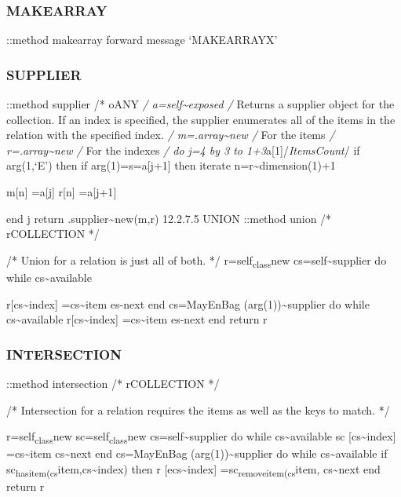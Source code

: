 \hypertarget{makearray-1}{%
\subsubsection{MAKEARRAY}\label{makearray-1}}

::method makearray forward message `MAKEARRAYX'

\hypertarget{supplier-1}{%
\subsubsection{SUPPLIER}\label{supplier-1}}

::method supplier /* oANY \emph{/ a=self\textasciitilde exposed /}
Returns a supplier object for the collection. If an index is specified,
the supplier enumerates all of the items in the relation with the
specified index. \emph{/ m=.array\textasciitilde new /} For the items
\emph{/ r=.array\textasciitilde new /} For the indexes \emph{/ do j=4 by
3 to 1+3}a{[}1{]}/\emph{ItemsCount}/ if arg(1,`E') then if
arg(1)=s=a{[}j+1{]} then iterate n=r\textasciitilde dimension(1)+1

m{[}n{]} =a{[}j{]} r{[}n{]} =a{[}j+1{]}

end j return .supplier\textasciitilde new(m,r) 12.2.7.5 UNION ::method
union /* rCOLLECTION */

/* Union for a relation is just all of both. */
r=self\textsubscript{class}new cs=self\textasciitilde supplier do while
cs\textasciitilde available

r{[}cs\textasciitilde index{]} =cs\textasciitilde item es-next end
cs=MayEnBag (arg(1))\textasciitilde supplier do while
cs\textasciitilde available r{[}cs\textasciitilde index{]}
=cs\textasciitilde item es-next end return r

\hypertarget{intersection-2}{%
\subsubsection{INTERSECTION}\label{intersection-2}}

::method intersection /* rCOLLECTION */

/* Intersection for a relation requires the items as well as the keys to
match. */

r=self\textsubscript{class}new sc=self\textsubscript{class}new
cs=self\textasciitilde supplier do while cs\textasciitilde available sc
{[}cs\textasciitilde index{]} =cs\textasciitilde item
cs\textasciitilde next end cs=MayEnBag (arg(1))\textasciitilde supplier
do while cs\textasciitilde available if
sc\textsubscript{hasitem(cs}item,cs\textasciitilde index) then r
{[}ecs\textasciitilde index{]} =sc\textsubscript{removeitem(cs}item,
cs\textasciitilde next end return r

